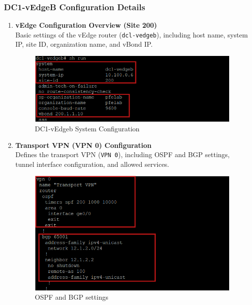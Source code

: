 \documentclass[12pt,english]{report}
\begin{document}
\subsubsection{DC1-vEdgeB Configuration Details}
\begin{enumerate}
    \item \textbf{vEdge Configuration Overview (Site 200)} \\
    Basic settings of the vEdge router (\texttt{dcl-vedgeb}), including host name, system IP, site ID, organization name, and vBond IP.
\begin{figure}[H]
    \centering
    \includegraphics[width= 1\textwidth]{chapitre 3/dc1vedgeb1.png}
    \caption{DC1-vEdgeb System Configuration}
    \label{fig: DC1-vEdgeb System Configuration}
\end{figure}
    \item \textbf{Transport VPN (VPN 0) Configuration} \\
    Defines the transport VPN (\texttt{VPN 0}), including OSPF and BGP settings, tunnel interface configuration, and allowed services.
\begin{figure}[H]
    \centering
    \includegraphics[width= 1\textwidth]{chapitre 3/dc1vedgeb2.png}
    \caption{OSPF and BGP settings}
    \label{fig: OSPF and BGP settings}
\end{figure}
\begin{figure}[H]

\end{figure}
\end{enumerate}
\end{document}
